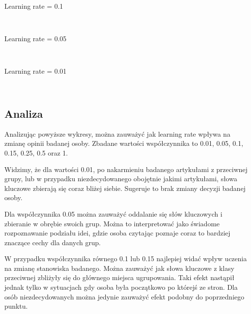 \documentclass[11pt]{article}
\begin{document}
    \newpage
    Learning rate = 0.1

    \begin{center}
    \end{center}
    { \hspace*{\fill} \\}

    \newpage
    Learning rate = 0.05

    \begin{center}
    \end{center}
    { \hspace*{\fill} \\}

    \newpage
    Learning rate = 0.01

    \begin{center}
    \end{center}
    { \hspace*{\fill} \\}
    \newpage

    \subsection*{Analiza}

    Analizując powyższe wykresy, można zauważyć jak learning rate wpływa na zmianę opinii badanej osoby. Zbadane wartości współczynnika to 0.01, 0.05, 0.1, 0.15, 0.25, 0.5 oraz 1. 

Widzimy, że dla wartości 0.01, po nakarmieniu badanego artykułami z przeciwnej grupy, lub w przypadku niezdecydowanego obojętnie jakimi artykułami, słowa kluczowe zbierają się coraz bliżej siebie. Sugeruje to brak zmiany decyzji badanej osoby. 

Dla współczynnika 0.05 można zauważyć oddalanie się słów kluczowych i zbieranie w obrębie swoich grup. Można to interpretować jako świadome rozpoznawanie podziału idei, gdzie osoba czytając poznaje coraz to bardziej znaczące cechy dla danych grup.

W przypadku współczynnika równego 0.1 lub 0.15 najlepiej widać wpływ uczenia na zmianę stanowiska badanego. Można zauważyć jak słowa kluczowe z klasy przeciwnej zbliżyły się do głównego miejsca ugrupowania. Taki efekt nastąpił jednak tylko w sytuacjach gdy osoba była początkowo po którejś ze stron. Dla osób niezdecydowanych można jedynie zauważyć efekt podobny do poprzedniego punktu.
\end{document}
